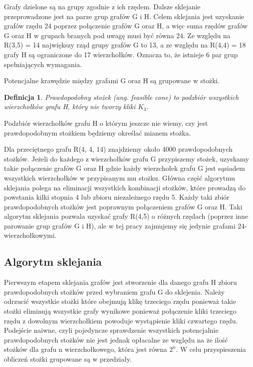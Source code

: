 \documentclass[11pt]{article}
\newtheorem{definition}{Definicja}[section]
\begin{document}
Grafy dzielone są na grupy zgodnie z ich rzędem. Dalsze sklejanie przeprowadzone jest na parze grup grafów G i H. Celem sklejania jest uzyskanie grafów rzędu 24 poprzez połączenie grafów G oraz H, a więc suma rzędów grafów G oraz H w grupach branych pod uwagę musi być równa 24. Ze względu na R(3,5) = 14 największy rząd grupy grafów G to 13, a ze względu na R(4,4) = 18 grafy H są ograniczone do 17 wierzchołków. Oznacza to, że istnieje 6 par grup spełniających wymagania.

Potencjalne krawędzie między grafami G oraz H są grupowane w stożki.

\begin{definition}
Prawdopodobny stożek (ang. feasible cone) to podzbiór wszystkich wierzchołków grafu H, który nie tworzy kliki $K_3$\cite{mainpaper}. 
\end{definition}

Podzbiór wierzchołków grafu H o którym jeszcze nie wiemy, czy jest prawdopodobnym stożkiem będziemy  określać mianem stożka.

Dla przeciętnego grafu R(4, 4, 14) znajdziemy około 4000 prawdopodobnych stożków. Jeżeli do każdego z wierzchołków grafu G przypiszemy stożek, uzyskamy takie połączenie grafów G oraz H gdzie każdy wierzchołek grafu G jest sąsiadem wszystkich wierzchołków w przypisanym mu stożku. Główna część algorytmu sklejania polega na eliminacji wszystkich kombinacji stożków, które prowadzą do powstania kilki stopnia 4 lub zbioru niezależnego rzędu 5. Każdy taki zbiór prawdopodobnych stożków jest poprawnym połączeniem grafów G oraz H. Taki algorytm sklejania pozwala uzyskać grafy R(4,5) o różnych rzędach (poprzez inne parowanie grup grafów G i H), ale w tej pracy zajmujemy się jedynie grafami 24-wierzchołkowymi.




\subsection{Algorytm sklejania}
Pierwszym etapem sklejania grafów jest stworzenie dla danego grafu H zbioru prawdopodobnych stożków przed wybraniem grafu G do sklejenia. Należy odrzucić wszystkie stożki które obejmują klikę trzeciego rzędu ponieważ takie stożki eliminują wszystkie grafy wynikowe ponieważ połączenie kliki trzeciego rzędu z dowolnym wierzchołkiem powoduje wystąpienie kliki czwartego rzędu. Podejście naiwne, czyli pojedyncze sprawdzenie wszystkich potencjalnie prawdopodobnych stożków nie jest jednak opłacalne ze względu na że ilość stożków dla grafu n wierzchołkowego, która jest równa $2^n$. W celu przyspieszenia obliczeń stożki grupowane są w przedziały. 
\end{document}
